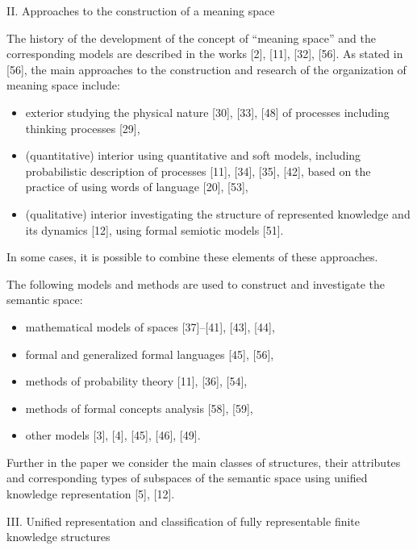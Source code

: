 \documentclass {article}
\begin{document}
\begin{multicols}{2}
\begin{center}
  \big II. Approaches to the construction of a meaning space
\end{center}
The history of the development of the concept of
“meaning space” and the corresponding models are described in the works [2], [11], [32], [56].\columnbreak
As stated in [56], the main approaches to the construction and research of the organization of meaning space
include:
\begin{itemize}[noitemsep]
    \item exterior studying the physical nature [30], [33], [48]
of processes including thinking processes [29],
    \item  (quantitative) interior using quantitative and soft
models, including probabilistic description of processes [11], [34], [35], [42], based on the practice
of using words of language [20], [53],
     \item (qualitative) interior investigating the structure of
represented knowledge and its dynamics [12], using
formal semiotic models [51].
\end{itemize}
In some cases, it is possible to combine these elements
of these approaches.
\par The following models and methods are used to construct and investigate the semantic space:
\begin{itemize}[noitemsep]
    \item  mathematical models of spaces [37]–[41], [43],
[44],
    \item   formal and generalized formal languages [45], [56],
     \item  methods of probability theory [11], [36], [54],
   \item methods of formal concepts analysis [58], [59],
   \item other models [3], [4], [45], [46], [49].

\end{itemize}
Further in the paper we consider the main classes of
structures, their attributes and corresponding types of
subspaces of the semantic space using unified knowledge
representation [5], [12].
\begin{center}
 \big III. Unified representation and classification of fully
representable finite knowledge structures 
\end{center}


\end{multicols}
\end{document}
